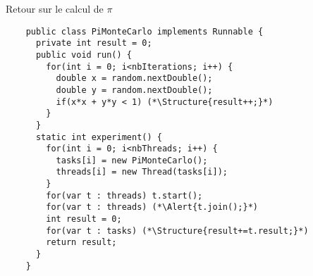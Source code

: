
\begingroup

\begin{frame}[fragile]{Retour sur le calcul de $\pi$}

  \vspace{-10mm}
  \begin{lstlisting}
    public class PiMonteCarlo implements Runnable {
      private int result = 0;
      public void run() {
        for(int i = 0; i<nbIterations; i++) {
          double x = random.nextDouble();
          double y = random.nextDouble();
          if(x*x + y*y < 1) (*\Structure{result++;}*)
        }
      }
      static int experiment() {
        for(int i = 0; i<nbThreads; i++) {
          tasks[i] = new PiMonteCarlo();
          threads[i] = new Thread(tasks[i]);
        }
        for(var t : threads) t.start();
        for(var t : threads) (*\Alert{t.join();}*)
        int result = 0;
        for(var t : tasks) (*\Structure{result+=t.result;}*)
        return result;
      }
    }
  \end{lstlisting}


\end{frame}

\endgroup
\endinput
